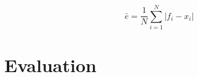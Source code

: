 \documentclass{llncs}
\begin{document}
\begin{equation}
\label{eq:mean}
\bar{e} = \frac{1}{N}\sum_{i=1}^N{\lvert f_i - x_i\rvert}
\end{equation}


\section{Evaluation}
\end{document}
